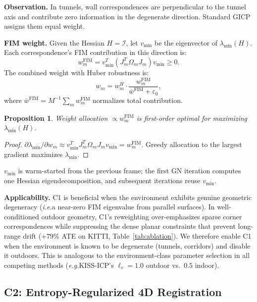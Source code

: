 \documentclass[journal,letterpaper,10pt]{IEEEtran}
\newtheorem{proposition}{Proposition}
\newcommand{\vmin}{v_{\min}}
\newcommand{\FIM}{\mathcal{I}}
\newcommand{\eg}{\textit{e.g.}}
\newcommand{\ie}{\textit{i.e.}}
\begin{document}
\textbf{Observation.}
In tunnels, wall correspondences are perpendicular to the tunnel axis
and contribute zero information in the degenerate direction.
Standard GICP assigns them equal weight.

\textbf{FIM weight.}
Given the Hessian $H = \FIM$, let $\vmin$ be the eigenvector of
$\lambda_{\min}(H)$.
Each correspondence's FIM contribution in this direction is:
\begin{equation}
  w_m^{\mathrm{FIM}} = \vmin^T (J_m^T \Omega_m J_m) \vmin \geq 0.
  \label{eq:c1_fim}
\end{equation}
The combined weight with Huber robustness is:
\begin{equation}
  \boxed{w_m = w_m^H \cdot \frac{w_m^{\mathrm{FIM}}}{\bar{w}^{\mathrm{FIM}} + \varepsilon_0}},
  \label{eq:c1_weight}
\end{equation}
where $\bar{w}^{\mathrm{FIM}} = M^{-1}\sum_m w_m^{\mathrm{FIM}}$
normalizes total contribution.

\begin{proposition}\label{prop:c1}
Weight allocation $\propto w_m^{\mathrm{FIM}}$ is first-order optimal
for maximizing $\lambda_{\min}(H)$.
\end{proposition}
\begin{proof}
$\partial\lambda_{\min}/\partial w_m \approx \vmin^T J_m^T\Omega_m J_m\vmin = w_m^{\mathrm{FIM}}$.
Greedy allocation to the largest gradient maximizes $\lambda_{\min}$.
\end{proof}

$\vmin$ is warm-started from the previous frame; the first GN
iteration computes one Hessian eigendecomposition, and subsequent
iterations reuse $\vmin$.

\textbf{Applicability.}
C1 is beneficial when the environment exhibits genuine geometric
degeneracy (\ie a near-zero FIM eigenvalue from parallel surfaces).
In well-conditioned outdoor geometry, C1's reweighting
over-emphasizes sparse corner correspondences while suppressing
the dense planar constraints that prevent long-range drift
($+79\%$ ATE on KITTI, Table~\ref{tab:ablation}).
We therefore enable C1 when the environment is known to be
degenerate (tunnels, corridors) and disable it outdoors.
This is analogous to the environment-class parameter selection
in all competing methods (\eg KISS-ICP's
$\ell_v{=}1.0$ outdoor vs.\ $0.5$ indoor).

\subsection{C2: Entropy-Regularized 4D Registration}\label{sec:c2}
\end{document}
